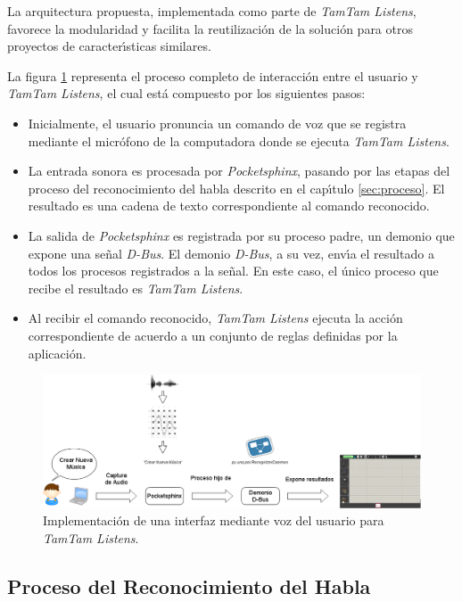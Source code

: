 La arquitectura propuesta, implementada como parte de \emph{TamTam Listens}, favorece la modularidad
y facilita la reutilizaci\'on de la soluci\'on para otros proyectos de caracter{\'\i}sticas similares.

La figura \ref{figure:tamtam-listens-proceso} representa el proceso completo de interacci\'on entre el
usuario y \emph{TamTam Listens}, el cual est\'a compuesto por los siguientes pasos:

\begin{itemize}
  \item Inicialmente, el usuario pronuncia un comando de voz que se registra mediante el micr\'ofono de
  la computadora donde se ejecuta \emph{TamTam Listens}.
  \item La entrada sonora es procesada por \emph{Pocketsphinx}, pasando por las etapas del proceso del
  reconocimiento del habla descrito en el cap{\'\i}tulo \ref{sec:proceso}. El resultado es una cadena de
  texto correspondiente al comando reconocido.
  \item La salida de \emph{Pocketsphinx} es registrada por su proceso padre, un demonio que expone
  una se\~nal \emph{D-Bus}.
  El demonio \emph{D-Bus}, a su vez, env{\'\i}a el resultado a todos los procesos registrados 
  a la se\~nal.
  En este caso, el \'unico proceso que recibe el resultado es \emph{TamTam Listens}.
  \item Al recibir el comando reconocido, \emph{TamTam Listens} ejecuta la acci\'on correspondiente de
  acuerdo a un conjunto de reglas definidas por la aplicaci\'on.
\end{itemize}

\begin{figure}[H] 
\centering
\includegraphics[width=1.0\textwidth]{./graphics/tamtam-proceso.png}
\caption{Implementación de una interfaz mediante voz del usuario para \emph{TamTam Listens}.}
\label{figure:tamtam-listens-proceso}
\end{figure}

\subsection{Proceso del Reconocimiento del Habla}
\label{sec:proceso-solucion}

